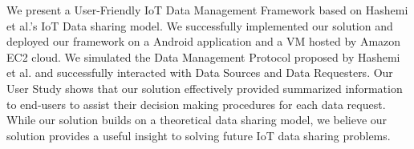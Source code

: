 We present a User-Friendly IoT Data Management Framework based on Hashemi et al.'s IoT Data sharing model. We successfully implemented our solution and deployed our framework on a Android application and a VM hosted by Amazon EC2 cloud. We simulated the Data Management Protocol proposed by Hashemi et al. and successfully interacted with Data Sources and Data Requesters. Our User Study shows that our solution effectively provided summarized information to end-users to assist their decision making procedures for each data request. While our solution builds on a theoretical data sharing model, we believe our solution provides a useful insight to solving future IoT data sharing problems.